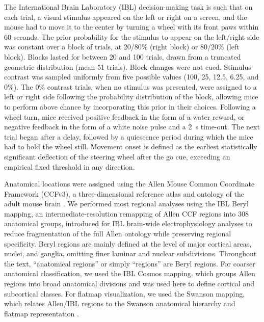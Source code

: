 \documentclass[10pt,lineno]{elife}
\begin{document}
The International Brain Laboratory (IBL) decision-making task\cite{laboratory2021standardized} is such that on each trial, a visual stimulus appeared on the left or right on a screen, and the mouse had to move it to the center by turning a wheel with its front paws within 60 seconds. The prior probability for the stimulus to appear on the left/right side was constant over a block of trials, at  20/80\% (right block) or 80/20\% (left block). Blocks lasted for between 20 and 100 trials, drawn from a truncated geometric distribution (mean 51 trials). Block changes were not cued. Stimulus contrast was sampled uniformly from five possible values (100, 25, 12.5, 6.25, and 0\%). The 0\% contrast trials, when no stimulus was presented, were assigned to a left or right side following the probability distribution of the block, allowing mice to perform above chance by incorporating this prior in their choices.  Following a wheel turn, mice received positive feedback in the form of a water reward, or negative feedback in the form of a white noise pulse and a \SI{2}{\second} time-out. The next trial began after a delay, followed by a quiescence period during which the mice had to hold the wheel still. Movement onset is defined as the earliest statistically significant deflection of the steering wheel after the go cue, exceeding an empirical fixed threshold in any direction\cite{laboratory2021standardized}.

Anatomical locations were assigned using the Allen Mouse Common Coordinate
Framework (CCFv3), a three-dimensional reference atlas and ontology of the
adult mouse brain \citep{Wang2020AllenCCF}. We performed most regional analyses
using the IBL Beryl mapping, an intermediate-resolution remapping of Allen CCF
regions into 308 anatomical groups, introduced for IBL brain-wide electrophysiology
analyses to reduce fragmentation of the full Allen ontology while preserving
regional specificity. Beryl regions are mainly defined at the level of major
cortical areas, nuclei, and ganglia, omitting finer laminar and nuclear
subdivisions. Throughout the text, ``anatomical regions'' or simply ``regions'' are Beryl regions. For coarser anatomical classification, we used the IBL Cosmos
mapping, which groups Allen regions into broad anatomical divisions and was used
here to define cortical and subcortical classes. For flatmap visualization, we
used the Swanson mapping, which relates Allen/IBL regions to the Swanson
anatomical hierarchy and flatmap representation \citep{Swanson2004BrainMaps,
Swanson2018BrainMaps}.
\end{document}
